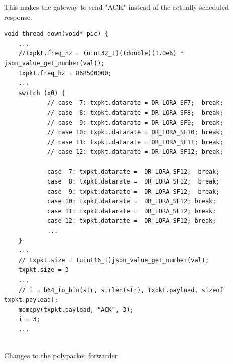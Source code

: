 This makes the gateway to send "ACK" instead of the actually scheduled response.

\begin{listing}[h]
    \begin{verbatim}
void thread_down(void* pic) {
    ...
    //txpkt.freq_hz = (uint32_t)((double)(1.0e6) * json_value_get_number(val));
    txpkt.freq_hz = 868500000;
    ...
    switch (x0) {
            // case  7: txpkt.datarate = DR_LORA_SF7;  break;
            // case  8: txpkt.datarate = DR_LORA_SF8;  break;
            // case  9: txpkt.datarate = DR_LORA_SF9;  break;
            // case 10: txpkt.datarate = DR_LORA_SF10; break;
            // case 11: txpkt.datarate = DR_LORA_SF11; break;
            // case 12: txpkt.datarate = DR_LORA_SF12; break;
            
            case  7: txpkt.datarate =  DR_LORA_SF12;  break;
            case  8: txpkt.datarate =  DR_LORA_SF12;  break;
            case  9: txpkt.datarate =  DR_LORA_SF12;  break;
            case 10: txpkt.datarate =  DR_LORA_SF12; break;
            case 11: txpkt.datarate =  DR_LORA_SF12; break;
            case 12: txpkt.datarate =  DR_LORA_SF12; break;
            ... 
    }
    ...
    // txpkt.size = (uint16_t)json_value_get_number(val);
    txpkt.size = 3
    ... 
    // i = b64_to_bin(str, strlen(str), txpkt.payload, sizeof txpkt.payload);
    memcpy(txpkt.payload, "ACK", 3);
    i = 3;
    ...
           

        \end{verbatim}
        \caption{Changes to the polypacket forwarder}
        \label{lst:polypkt}
\end{listing}

